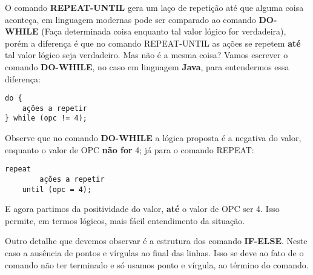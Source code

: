 O comando \textbf{REPEAT-UNTIL} gera um laço de repetição até que alguma coisa aconteça, em linguagem modernas pode ser comparado ao comando \textbf{DO-WHILE} (Faça determinada coisa enquanto tal valor lógico for verdadeira), porém a diferença é que no comando REPEAT-UNTIL as ações se repetem \textbf{até} tal valor lógico seja verdadeiro. Mas não é a mesma coisa? Vamos escrever o comando \textbf{DO-WHILE}, no caso em linguagem \textbf{Java}, para entendermos essa diferença:
\begin{lstlisting}[]
do {
	ações a repetir
} while (opc != 4);
\end{lstlisting}

Observe que no comando \textbf{DO-WHILE} a lógica proposta é a negativa do valor, enquanto o valor de OPC \textbf{não for} 4; já para o comando REPEAT:
\begin{lstlisting}[]
	repeat
		ações a repetir
	until (opc = 4);
\end{lstlisting}

E agora partimos da positividade do valor, \textbf{até} o valor de OPC ser 4. Isso permite, em termos lógicos, mais fácil entendimento da situação.

Outro detalhe que devemos observar é a estrutura dos comando \textbf{IF-ELSE}. Neste caso a ausência de pontos e vírgulas ao final das linhas. Isso se deve ao fato de o comando não ter terminado e só usamos ponto e vírgula, ao término do comando.
\clearpage